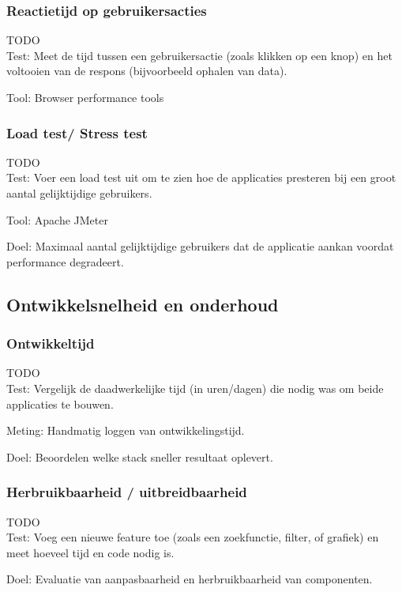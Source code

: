 \subsubsection{Reactietijd op gebruikersacties}
TODO
\\
Test: Meet de tijd tussen een gebruikersactie (zoals klikken op een knop) en het voltooien van de respons (bijvoorbeeld ophalen van data).

Tool: Browser performance tools
\subsubsection{Load test/ Stress test}
TODO
\\
Test: Voer een load test uit om te zien hoe de applicaties presteren bij een groot aantal gelijktijdige gebruikers.

Tool: Apache JMeter

Doel: Maximaal aantal gelijktijdige gebruikers dat de applicatie aankan voordat performance degradeert.

\subsection{Ontwikkelsnelheid en onderhoud}

\subsubsection{Ontwikkeltijd}
TODO
\\
Test: Vergelijk de daadwerkelijke tijd (in uren/dagen) die nodig was om beide applicaties te bouwen.

Meting: Handmatig loggen van ontwikkelingstijd.

Doel: Beoordelen welke stack sneller resultaat oplevert.
\subsubsection{Herbruikbaarheid / uitbreidbaarheid}
TODO
\\
Test: Voeg een nieuwe feature toe (zoals een zoekfunctie, filter, of grafiek) en meet hoeveel tijd en code nodig is.

Doel: Evaluatie van aanpasbaarheid en herbruikbaarheid van componenten.


